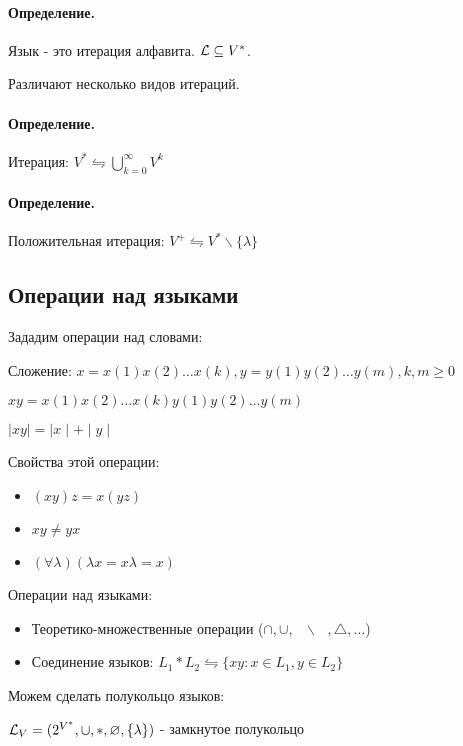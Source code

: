 \documentclass{report}
\newcommand{\bslash}{\mbox{ } \backslash \mbox{ }}
\begin{document}
\paragraph*{Определение.}
Язык - это итерация алфавита.
$ {\cal L} \subseteq V^{*}$.

\medskip

Различают несколько видов итераций.
\paragraph*{Определение.}
Итерация: $V^{*} \leftrightharpoons \bigcup_{k=0}^{\infty}V^{k} $


\paragraph*{Определение.}
Положительная итерация: $V^{+} \leftrightharpoons V^{*}\backslash \{\lambda\} $

\subsection{Операции над языками}
Зададим операции над словами:

Сложение: $x = x(1)x(2)\ldots x(k), y = y(1)y(2)\ldots y(m), k,m \ge 0$

$xy = x(1)x(2)\ldots x(k)y(1)y(2)\ldots y(m)$

$ \mid xy \mid =  \mid x \mid + \mid y \mid $

Свойства этой операции:
\begin{itemize}
	\item $(xy)z = x(yz)$
	\item  $xy \neq  yx$
	\item $(\forall \lambda)(\lambda x = x\lambda = x)$
\end{itemize}

\medskip

Операции над языками:
\begin{itemize}
	\item Теоретико-множественные операции ($\cap, \cup, \bslash, \triangle,\ldots$)
	\item Соединение языков: $L_1*L_2 \leftrightharpoons
		\{xy:x \in  L_1, y \in  L_2\} $
\end{itemize}

\medskip

Можем сделать полукольцо языков:

$ {\cal L}_{V} = (2^{V^{*}}, \cup, *, \varnothing, \{\lambda\} )$ - замкнутое полукольцо
\end{document}
